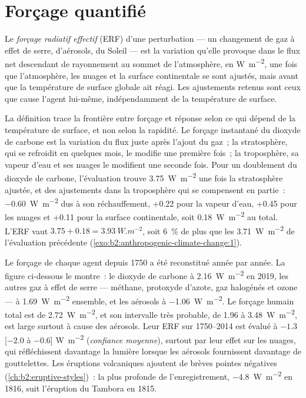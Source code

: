 \section{Forçage quantifié}\label{sec:b2:anthropogenic-climate-change:forcing}

\begin{definition}\label{def:b2:anthropogenic-climate-change:erf}
Le \emph{forçage radiatif effectif} (ERF) d'une perturbation
--- un changement de gaz à effet de serre, d'aérosols, du Soleil --- est la variation qu'elle
provoque dans le flux net descendant de rayonnement au sommet de l'atmosphère, en
\unit{W.m^{-2}}, une fois que l'atmosphère, les nuages et la surface continentale se sont
ajustés, mais avant que la température de surface globale ait réagi. Les ajustements retenus
sont ceux que cause l'agent lui-même, indépendamment de la température de surface.
\end{definition}

La définition trace la frontière entre forçage et réponse selon ce qui dépend de la température de surface,
et non selon la rapidité. Le forçage instantané du dioxyde de carbone est la variation du flux juste après
l'ajout du gaz~; la stratosphère, qui se refroidit en quelques mois, le modifie une première fois~; la
troposphère, sa vapeur d'eau et ses nuages le modifient une seconde fois. Pour un doublement du dioxyde de
carbone, l'évaluation trouve \qty{3.75}{W.m^{-2}} une fois la stratosphère ajustée, et des ajustements dans
la troposphère qui se compensent en partie~: \qty{-0.60}{W.m^{-2}} dus à son réchauffement, +0.22 pour la
vapeur d'eau, +0.45 pour les nuages et +0.11 pour la surface continentale, soit \qty{+0.18}{W.m^{-2}} au
total. L'ERF vaut $3.75 + 0.18 = \qty{3.93}{W.m^{-2}}$, soit \qty{6}{\percent} de plus que les
\qty{3.71}{W.m^{-2}} de l'évaluation précédente (\cref{exo:b2:anthropogenic-climate-change:1}).

Le forçage de chaque agent depuis 1750 a été reconstitué année par année. La figure ci-dessous le montre~:
le dioxyde de carbone à \qty{2.16}{W.m^{-2}} en 2019, les autres gaz à effet de serre --- méthane, protoxyde
d'azote, gaz halogénés et ozone --- à \qty{1.69}{W.m^{-2}} ensemble, et les aérosols à
\qty{-1.06}{W.m^{-2}}. Le forçage humain total est de \qty{2.72}{W.m^{-2}}, et son intervalle très probable,
de 1.96 à \qty{3.48}{W.m^{-2}}, est large surtout à cause des aérosols. Leur ERF sur 1750--2014 est évalué à
$-1.3$ [$-2.0$ à $-0.6$] \unit{W.m^{-2}} (\emph{confiance moyenne}), surtout par leur effet sur les nuages,
qui réfléchissent davantage la lumière lorsque les aérosols fournissent davantage de gouttelettes. Les
éruptions volcaniques ajoutent de brèves pointes négatives (\cref{ch:b2:eruptive-styles})~: la plus profonde
de l'enregistrement, \qty{-4.8}{W.m^{-2}} en 1816, suit l'éruption du Tambora en 1815.

